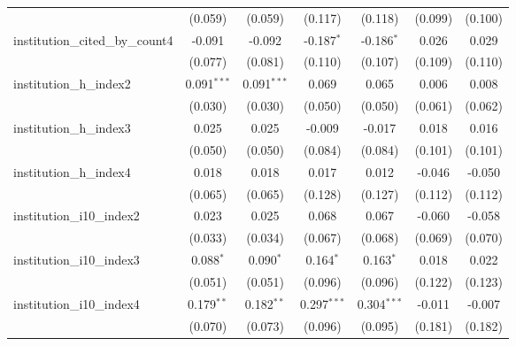 \begin{tabular}{lcccccc}
                                         & (0.059)        & (0.059)        & (0.117)       & (0.118)       & (0.099)        & (0.100)\\   
   institution\_cited\_by\_count4        & -0.091         & -0.092         & -0.187$^{*}$  & -0.186$^{*}$  & 0.026          & 0.029\\   
                                         & (0.077)        & (0.081)        & (0.110)       & (0.107)       & (0.109)        & (0.110)\\   
   institution\_h\_index2                & 0.091$^{***}$  & 0.091$^{***}$  & 0.069         & 0.065         & 0.006          & 0.008\\   
                                         & (0.030)        & (0.030)        & (0.050)       & (0.050)       & (0.061)        & (0.062)\\   
   institution\_h\_index3                & 0.025          & 0.025          & -0.009        & -0.017        & 0.018          & 0.016\\   
                                         & (0.050)        & (0.050)        & (0.084)       & (0.084)       & (0.101)        & (0.101)\\   
   institution\_h\_index4                & 0.018          & 0.018          & 0.017         & 0.012         & -0.046         & -0.050\\   
                                         & (0.065)        & (0.065)        & (0.128)       & (0.127)       & (0.112)        & (0.112)\\   
   institution\_i10\_index2              & 0.023          & 0.025          & 0.068         & 0.067         & -0.060         & -0.058\\   
                                         & (0.033)        & (0.034)        & (0.067)       & (0.068)       & (0.069)        & (0.070)\\   
   institution\_i10\_index3              & 0.088$^{*}$    & 0.090$^{*}$    & 0.164$^{*}$   & 0.163$^{*}$   & 0.018          & 0.022\\   
                                         & (0.051)        & (0.051)        & (0.096)       & (0.096)       & (0.122)        & (0.123)\\   
   institution\_i10\_index4              & 0.179$^{**}$   & 0.182$^{**}$   & 0.297$^{***}$ & 0.304$^{***}$ & -0.011         & -0.007\\   
                                         & (0.070)        & (0.073)        & (0.096)       & (0.095)       & (0.181)        & (0.182)\\   

\end{tabular}
